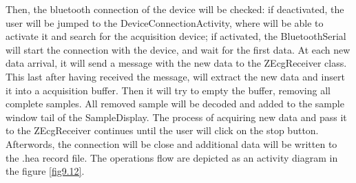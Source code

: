 Then, the bluetooth connection of the device will be checked: if deactivated, the user will be jumped to the DeviceConnectionActivity, where will be able to activate it and search for the acquisition device; if activated, the BluetoothSerial will start the connection with the device, and wait for the first data. At each new data arrival, it will send a message with the new data to the ZEcgReceiver class. This last after having received the message, will extract the new data and insert it into a acquisition buffer. Then it will try to empty the buffer, removing all complete samples. All removed sample will be decoded and added to the sample window tail of the SampleDisplay.
The process of acquiring new data and pass it to the ZEcgReceiver continues until the user will click on the stop button. Afterwords, the connection will be close and additional data will be written to the .hea record file. The operations flow are depicted as an activity diagram in the figure \ref{fig9.12}.

